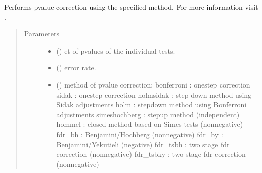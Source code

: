 \documentclass[letterpaper,10pt,english]{sphinxmanual}
\begin{document}

\begin{fulllineitems}
\label{\detokenize{_autosummary/analytics_core.analytics:analytics_core.analytics.analytics.apply_pvalue_correction}}
Performs p\sphinxhyphen{}value correction using the specified method. For more information visit .
\begin{quote}\begin{description}
\item[{Parameters}] \leavevmode\begin{itemize}
\item {} 
 () \textendash{} et of p\sphinxhyphen{}values of the individual tests.

\item {} 
 () \textendash{} error rate.

\item {} 
 () \textendash{} method of p\sphinxhyphen{}value correction:
\sphinxhyphen{} bonferroni : one\sphinxhyphen{}step correction
\sphinxhyphen{} sidak : one\sphinxhyphen{}step correction
\sphinxhyphen{} holm\sphinxhyphen{}sidak : step down method using Sidak adjustments
\sphinxhyphen{} holm : step\sphinxhyphen{}down method using Bonferroni adjustments
\sphinxhyphen{} simes\sphinxhyphen{}hochberg : step\sphinxhyphen{}up method (independent)
\sphinxhyphen{} hommel : closed method based on Simes tests (non\sphinxhyphen{}negative)
\sphinxhyphen{} fdr\_bh : Benjamini/Hochberg (non\sphinxhyphen{}negative)
\sphinxhyphen{} fdr\_by : Benjamini/Yekutieli (negative)
\sphinxhyphen{} fdr\_tsbh : two stage fdr correction (non\sphinxhyphen{}negative)
\sphinxhyphen{} fdr\_tsbky : two stage fdr correction (non\sphinxhyphen{}negative)


\end{itemize}
\end{description}
\end{quote}
\end{fulllineitems}
\end{document}
